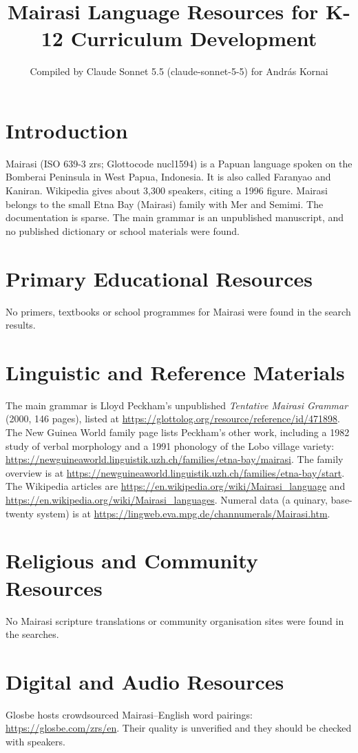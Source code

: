 \documentclass[12pt]{article}
\title{Mairasi Language Resources for K-12 Curriculum Development}
\author{Compiled by Claude Sonnet 5.5 (claude-sonnet-5-5) for Andr\'as Kornai}
\date{}
\begin{document}
\maketitle

\section{Introduction}
Mairasi (ISO 639-3 zrs; Glottocode nucl1594) is a Papuan language spoken on the Bomberai Peninsula in West Papua, Indonesia. It is also called Faranyao and Kaniran. Wikipedia gives about 3,300 speakers, citing a 1996 figure. Mairasi belongs to the small Etna Bay (Mairasi) family with Mer and Semimi. The documentation is sparse. The main grammar is an unpublished manuscript, and no published dictionary or school materials were found.

\section{Primary Educational Resources}
No primers, textbooks or school programmes for Mairasi were found in the search results.

\section{Linguistic and Reference Materials}
The main grammar is Lloyd Peckham's unpublished \emph{Tentative Mairasi Grammar} (2000, 146 pages), listed at \url{https://glottolog.org/resource/reference/id/471898}. The New Guinea World family page lists Peckham's other work, including a 1982 study of verbal morphology and a 1991 phonology of the Lobo village variety: \url{https://newguineaworld.linguistik.uzh.ch/families/etna-bay/mairasi}. The family overview is at \url{https://newguineaworld.linguistik.uzh.ch/families/etna-bay/start}. The Wikipedia articles are \url{https://en.wikipedia.org/wiki/Mairasi_language} and \url{https://en.wikipedia.org/wiki/Mairasi_languages}. Numeral data (a quinary, base-twenty system) is at \url{https://lingweb.eva.mpg.de/channumerals/Mairasi.htm}.

\section{Religious and Community Resources}
No Mairasi scripture translations or community organisation sites were found in the searches.

\section{Digital and Audio Resources}
Glosbe hosts crowdsourced Mairasi--English word pairings: \url{https://glosbe.com/zrs/en}. Their quality is unverified and they should be checked with speakers.
\end{document}
